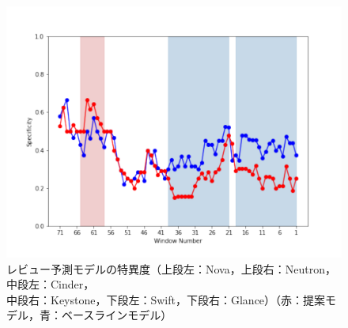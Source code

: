 \documentclass[submit]{ipsj}
\begin{document}
\begin{figure}[t]
\begin{minipage}[b]{0.65\columnwidth}
    \includegraphics[width=1\columnwidth]{Uenaka_fig/RQ2_result/Glance/Glance_review_Specificity.pdf}
\end{minipage}
    \caption{レビュー予測モデルの特異度（上段左：Nova，上段右：Neutron，中段左：Cinder，\\ 中段右：Keystone，下段左：Swift，下段右：Glance）（赤：提案モデル，青：ベースラインモデル）}
    \label{fig:review_p}
\end{figure}
\end{document}
